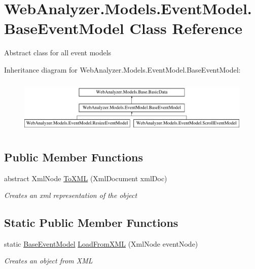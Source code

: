 \hypertarget{class_web_analyzer_1_1_models_1_1_event_model_1_1_base_event_model}{}\section{Web\+Analyzer.\+Models.\+Event\+Model.\+Base\+Event\+Model Class Reference}
\label{class_web_analyzer_1_1_models_1_1_event_model_1_1_base_event_model}


Abstract class for all event models  


Inheritance diagram for Web\+Analyzer.\+Models.\+Event\+Model.\+Base\+Event\+Model\+:\begin{figure}[H]
\begin{center}
\leavevmode
\includegraphics[height=2.625000cm]{class_web_analyzer_1_1_models_1_1_event_model_1_1_base_event_model}
\end{center}
\end{figure}
\subsection*{Public Member Functions}
\begin{DoxyCompactItemize}
\item 
abstract Xml\+Node \hyperlink{class_web_analyzer_1_1_models_1_1_event_model_1_1_base_event_model_a8e39cb407315d0f6eca3fb8e854e8dba}{To\+X\+M\+L} (Xml\+Document xml\+Doc)
\begin{DoxyCompactList}\small\item\em Creates an xml representation of the object \end{DoxyCompactList}\end{DoxyCompactItemize}
\subsection*{Static Public Member Functions}
\begin{DoxyCompactItemize}
\item 
static \hyperlink{class_web_analyzer_1_1_models_1_1_event_model_1_1_base_event_model}{Base\+Event\+Model} \hyperlink{class_web_analyzer_1_1_models_1_1_event_model_1_1_base_event_model_a04c1e146840d80a80575bd4644dad0c8}{Load\+From\+X\+M\+L} (Xml\+Node event\+Node)
\begin{DoxyCompactList}\small\item\em Creates an object from X\+M\+L \end{DoxyCompactList}\end{DoxyCompactItemize}
